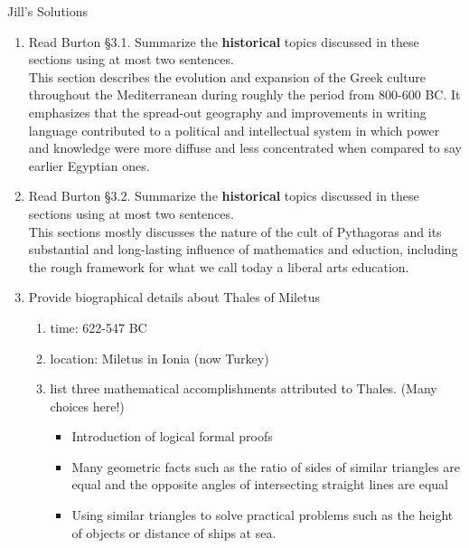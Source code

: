 \documentclass[12pt]{article}
\begin{document}
\begin{center} Jill's Solutions \end{center}
\begin{enumerate}
\item Read Burton \S 3.1. Summarize the \textbf{historical} topics discussed in these sections using at most two sentences.\\

This section describes the evolution and expansion of the Greek culture throughout the Mediterranean during roughly the period from 800-600 BC. It emphasizes that the spread-out geography and improvements in writing language contributed to a political and intellectual system in which power and knowledge were more diffuse and less concentrated when compared to say earlier Egyptian ones.\\
\item Read Burton \S 3.2. Summarize the \textbf{historical} topics discussed in these sections using at most two sentences.\\

This sections mostly discusses the nature of the cult of Pythagoras and its substantial and long-lasting influence of mathematics and eduction, including the rough framework for what we call today a liberal arts education.\\

\item Provide biographical details about Thales of Miletus
	\begin{enumerate}
	\item time: 622-547 BC
	\item location: Miletus in Ionia (now Turkey)
	\item list three mathematical accomplishments attributed to Thales. (Many choices here!)\\
	\begin{itemize}
	\item Introduction of logical formal proofs
	\item Many geometric facts such as the ratio of sides of similar triangles are equal and the opposite angles of intersecting straight lines are equal
	\item Using similar triangles to solve practical problems such as the height of objects or distance of ships at sea.
	\end{itemize}
	\end{enumerate}


\end{enumerate}
\end{document}
